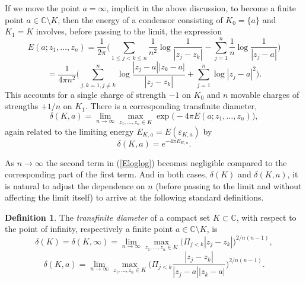 \documentclass[reqno,12pt]{article}
\theoremstyle{plain}
\theoremstyle{definition}
\newtheorem{definition}{Definition}[section]
\numberwithin{equation}{section}
\numberwithin{figure}{section}
\def\C{{\mathbb C}}
\begin{document}
If we move the point $a=\infty$, implicit in the above discussion, to become a finite point $a\in\C\setminus K$,
then the energy of a condensor consisting of  $K_0=\{a\}$ and $K_1=K$ involves, before passing to the limit, the expression 
\begin{equation*}
E(a; z_1,\dots, z_n)= \frac{1}{2\pi}\Big({\sum_{1\leq j<k\leq n}} \frac{1}{n^2}\log \frac{1}{|z_j-z_k|}
- \sum_{j=1}^n \frac{1}{n}\log \frac{1}{|z_j-a|}\Big)
\end{equation*}
\begin{equation}\label{Eloglog}
=\frac{1}{4\pi n^2}\Big(\sum_{j,k=1,j\ne k}^n \log \frac{|z_j-a||z_k-a|}{|z_j-z_k|}+\sum_{j=1}^n\log |z_j-a|^2\Big).
\end{equation}
This accounts for a single charge of strength $-1$ on $K_0$ and $n$ movable charges of strengths $+1/n$ on $K_1$. 
There is a corresponding transfinite diameter,
$$
\delta(K,a)=\lim_{n\to\infty}\max_{z_1,\dots,z_n\in K}\exp\big(-4\pi E(a;z_1,\dots,z_n)\big),
$$
again related to the limiting energy $E_{K,a}=E(\varepsilon_{K,a})$ by
\begin{equation}\label{deltaKaEKa}
\delta(K,a)=e^{-4\pi E_{K,a}}.
\end{equation}

As $n\to \infty$ the second term in (\ref{Eloglog}) becomes negligible compared to the corresponding part of the first term.    
And in both cases, $\delta(K)$ and $\delta(K,a)$, it is natural to adjust the dependence on $n$ (before passing to the
limit and without affecting the limit itself) to arrive at the following standard definitions.

\begin{definition}\label{def:transfinite diameter}
The {\it transfinite diameter} of a compact set $K\subset\C$, with respect to the point of infinity, respectively
a finite point $a\in\C\setminus K$, is 
$$
\delta(K)=\delta(K,\infty)=\lim_{n\to \infty}\max_{z_1,\dots,z_n\in K}\Big(\Pi_{j<k}|z_j-z_k|\Big)^{2/n(n-1)},
$$
$$
\delta(K,a)=\lim_{n\to\infty}\max_{z_1,\dots,z_n\in K}\Big(\Pi_{j<k}\frac{|z_j-z_k|}{|z_j-a||z_k-a|}\Big)^{2/n(n-1)}.
$$
\end{definition}
\end{document}
